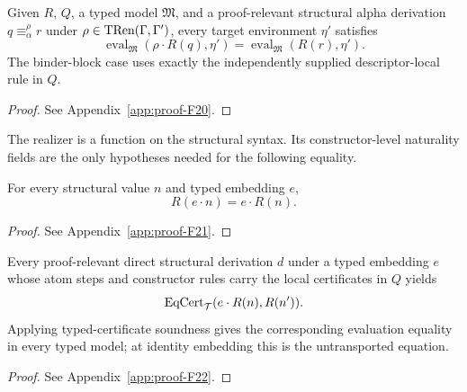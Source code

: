 \begin{lemma}
\label{lem:alpha-sound}
Given $R$, $Q$, a typed model $\mathfrak M$, and a proof-relevant structural
alpha derivation $q\equiv_{\alpha}^{\rho}r$ under
$\rho\in\operatorname{TRen}(\Gamma,\Gamma')$, every target environment $\eta'$ satisfies
\[
\operatorname{eval}_{\mathfrak M}(\rho\cdot R(q),\eta')=
\operatorname{eval}_{\mathfrak M}(R(r),\eta').
\]
The binder-block case uses exactly the independently supplied
descriptor-local rule in $Q$.
\end{lemma}
\begin{proof}See Appendix~\ref{app:proof-F20}.\end{proof}

The realizer is a function on the structural syntax.  Its constructor-level
naturality fields are the only hypotheses needed for the following equality.

\begin{lemma}
\label{lem:realization-natural}
For every structural value $n$ and typed embedding $e$,
\[
R(e\cdot n)=e\cdot R(n).
\]
\end{lemma}
\begin{proof}See Appendix~\ref{app:proof-F21}.\end{proof}

\begin{lemma}
\label{lem:port-sound}
Every proof-relevant direct structural derivation $d$ under a typed embedding
$e$ whose atom steps and constructor rules carry the local certificates in
$Q$ yields
\[
\operatorname{EqCert}_{\mathcal T}(e\cdot R(n),R(n')).
\]
Applying typed-certificate soundness gives the corresponding evaluation
equality in every typed model; at identity embedding this is the
untransported equation.
\end{lemma}
\begin{proof}See Appendix~\ref{app:proof-F22}.\end{proof}

